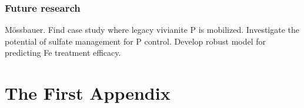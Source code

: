 \documentclass[12pt,twoside]{book}
\begin{document}
\subsection{Future research}\label{future-research}

Mössbauer.
Find case study where legacy vivianite P is mobilized.
Investigate the potential of sulfate management for P control.
Develop robust model for predicting Fe treatment efficacy.

\appendix

\chapter{The First Appendix}\label{the-first-appendix}
\renewcommand\bibname{References}


  \listoffigures
  \clearpage

  \listoftables
  \clearpage
\end{document}
